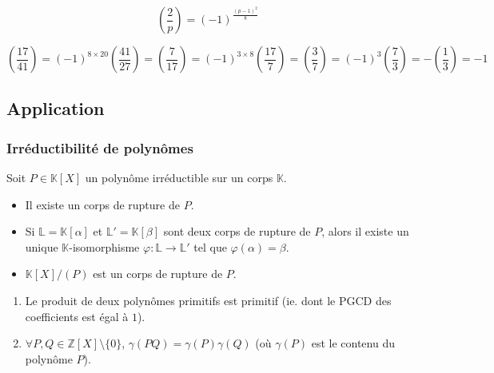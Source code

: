 	\begin{proposition}
		\[ \left( \frac{2}{p} \right) = (-1)^{\frac{(p-1)^2}{8}} \]
	\end{proposition}

	\begin{example}
		\[ \left( \frac{17}{41} \right) = (-1)^{8 \times 20} \left( \frac{41}{27} \right) = \left( \frac{7}{17} \right) = (-1)^{3 \times 8} \left( \frac{17}{7} \right) = \left( \frac{3}{7} \right) = (-1)^{3} \left( \frac{7}{3} \right) = - \left( \frac{1}{3} \right) = -1 \]
	\end{example}

	\subsection{Application}

	\subsubsection{Irréductibilité de polynômes}


	\begin{theorem}
		Soit $P \in \mathbb{K}[X]$ un polynôme irréductible sur un corps $\mathbb{K}$.
		\begin{itemize}
			\item Il existe un corps de rupture de $P$.
			\item Si $\mathbb{L} = \mathbb{K}[\alpha]$ et $\mathbb{L}' = \mathbb{K}[\beta]$ sont deux corps de rupture de $P$, alors il existe un unique $\mathbb{K}$-isomorphisme $\varphi : \mathbb{L} \rightarrow \mathbb{L}'$ tel que $\varphi(\alpha) = \beta$.
			\item $\mathbb{K}[X]/(P)$ est un corps de rupture de $P$.
		\end{itemize}
	\end{theorem}


	\begin{lemma}[Gauss]
		\begin{enumerate}[label=(\roman*)]
			\item Le produit de deux polynômes primitifs est primitif (ie. dont le PGCD des coefficients est égal à $1$).
			\item $\forall P, Q \in \mathbb{Z}[X] \setminus \{ 0 \}$, $\gamma(PQ) = \gamma(P) \gamma(Q)$ (où $\gamma(P)$ est le contenu du polynôme $P$).
		\end{enumerate}
	\end{lemma}

